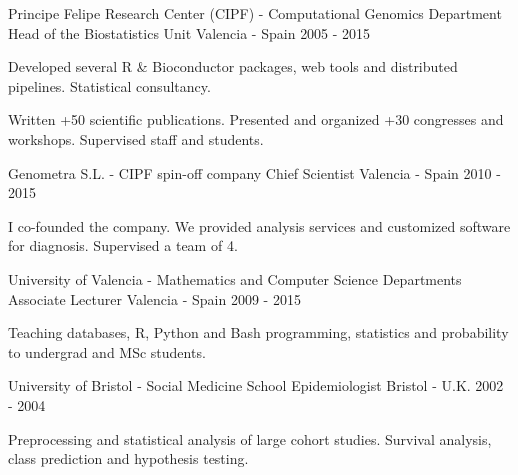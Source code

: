 \begin{cventries}

\cventry
{Principe Felipe Research Center (CIPF) - Computational Genomics Department} %
{Head of the Biostatistics Unit} %
{Valencia - Spain} %
{2005 - 2015} %
{ %
\begin{cvitems}
\item {Developed several R \& Bioconductor packages, web tools and distributed pipelines. Statistical consultancy.}
\item {Written +50 scientific publications. Presented and organized +30 congresses and workshops. Supervised staff and students.}
\end{cvitems} 
}


\cventry
{Genometra S.L. - CIPF spin-off company} %
{Chief Scientist} %
{Valencia - Spain} %
{2010 - 2015} %
{ %
\begin{cvitems}
\item {I co-founded the company. We provided analysis services and customized software for diagnosis. Supervised a team of 4.}
\end{cvitems} 
}


\cventry
{University of Valencia - Mathematics and Computer Science Departments} %
{Associate Lecturer} %
{Valencia - Spain} %
{2009 - 2015} %
{ %
\begin{cvitems}
\item {Teaching databases, R, Python and Bash programming, statistics and probability to undergrad and MSc students.}
\end{cvitems} 
}


\cventry
{University of Bristol - Social Medicine School} %
{Epidemiologist} %
{Bristol - U.K.} %
{2002 - 2004} %
{ %
\begin{cvitems}
\item {Preprocessing and statistical analysis of large cohort studies. Survival analysis, class prediction and hypothesis testing.} %
\end{cvitems}        
}


\end{cventries}
